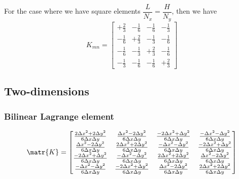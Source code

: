 For the case where we have square elements \ie $\dfrac{L}{N_{x}}=\dfrac{H}{N_{y}}$, then we have
\begin{equation}
  K_{mn}=\begin{bmatrix}
  +\frac{2}{3} & -\frac{1}{6} & -\frac{1}{6} & -\frac{1}{3} \\
  -\frac{1}{6} & +\frac{2}{3} & -\frac{1}{3} & -\frac{1}{6} \\
  -\frac{1}{6} & -\frac{1}{3} & +\frac{2}{3} & -\frac{1}{6} \\
  -\frac{1}{3} & -\frac{1}{6} & -\frac{1}{6} & +\frac{2}{3}
  \end{bmatrix}
  \label{eqn:FEMTwoDLaplaceSquareElementStiffnessMatrix}  
\end{equation}

\subsection{Two-dimensions}

\subsubsection{Bilinear Lagrange element}

\begin{equation}
  \matr{K}=\begin{bmatrix}
  \frac{2{\Delta x}^{2}+2{\Delta y}^{2}}{6\Delta x\Delta y} & \frac{{\Delta x}^{2}-2{\Delta y}^{2}}{6\Delta x\Delta y} &
  \frac{-2{\Delta x}^{2}+{\Delta y}^{2}}{6\Delta x\Delta y} & \frac{-{\Delta x}^{2}-{\Delta y}^{2}}{6\Delta x\Delta y} \\
  \frac{{\Delta x}^{2}-2{\Delta y}^{2}}{6\Delta x\Delta y} & \frac{2{\Delta x}^{2}+2{\Delta y}^{2}}{6\Delta x\Delta y} &
  \frac{-{\Delta x}^{2}-{\Delta y}^{2}}{6\Delta x\Delta y} & \frac{-2{\Delta x}^{2}+{\Delta y}^{2}}{6\Delta x\Delta y} \\
  \frac{-2{\Delta x}^{2}+{\Delta y}^{2}}{6\Delta x\Delta y} & \frac{-{\Delta x}^{2}-{\Delta y}^{2}}{6\Delta x\Delta y} &
  \frac{2{\Delta x}^{2}+2{\Delta y}^{2}}{6\Delta x\Delta y} & \frac{{\Delta x}^{2}-2{\Delta y}^{2}}{6\Delta x\Delta y} \\
  \frac{-{\Delta x}^{2}-{\Delta y}^{2}}{6\Delta x\Delta y} & \frac{-2{\Delta x}^{2}+{\Delta y}^{2}}{6\Delta x\Delta y} &
  \frac{{\Delta x}^{2}-2{\Delta y}^{2}}{6\Delta x\Delta y} & \frac{2{\Delta x}^{2}+2{\Delta y}^{2}}{6\Delta x\Delta y} 
  \end{bmatrix}
\end{equation}
  

